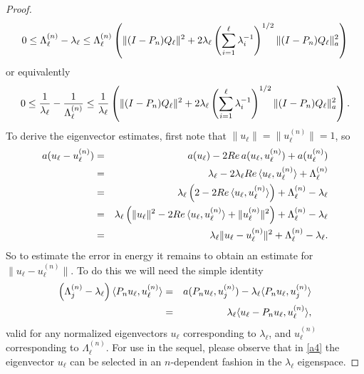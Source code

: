 \documentclass[final]{siamltex}
\numberwithin{equation}{section}
\begin{document}
\begin{proof}
\begin{equation} \notag
0 \le \Lambda_{\ell}^{(n)} -\lambda_{\ell} \le \Lambda_{\ell}^{(n)} \left(\|(I-P_n) Q_{\ell}\|^2 + 2 \lambda_{\ell} \left(\sum_{i=1}^{\ell} \lambda_i^{-1}\right)^{1/2} \|(I-P_n) Q_{\ell}\|_{a}^2
\right)
\end{equation}
or equivalently
\begin{equation} \notag
0 \le \frac{1}{\lambda_{\ell}}- \frac{1}{\Lambda_{\ell}^{(n)}} \le \frac{1}{\lambda_{\ell}} \left(\|(I-P_n) Q_{\ell}\|^2 + 2 \lambda_{\ell} \left(\sum_{i=1}^{\ell} \lambda_i^{-1}\right)^{1/2} \|(I-P_n) Q_{\ell}\|_{a}^2
\right).
\end{equation}
To derive the eigenvector estimates, first note that $\|u_{\ell}\|=\|u_{\ell}^{(n)}\|=1$, so
\begin{eqnarray}
a(u_{\ell}-u_{\ell}^{(n)})&=& a(u_{\ell}) -2 Re \, a(u_{\ell},u_{\ell}^{(n)}) + a (u_{\ell}^{(n)}) \notag \\
&=&  \lambda_{\ell} - 2 \lambda_{\ell} Re \, \langle u_{\ell}, u_{\ell}^{(n)} \rangle +\Lambda_{\ell}^{(n)}\notag \\
&=& \lambda_{\ell} \left(2 -2 Re \, \langle u_{\ell}, u_{\ell}^{(n)} \rangle \right) + \Lambda_{\ell}^{(n)}- \lambda_{\ell}\notag \\
&=&   \lambda_{\ell} \left(\|u_{\ell}\|^2-2 Re \, \langle u_{\ell}, u_{\ell}^{(n)} \rangle + \|u_{\ell}^{(n)}\|^2
\right) + \Lambda_{\ell}^{(n)}- \lambda_{\ell} \notag \\
&=&  \lambda_{\ell} \|u_{\ell}- u_{\ell}^{(n)}\|^2+ \Lambda_{\ell}^{(n)}- \lambda_{\ell}.\notag
\end{eqnarray}
So to estimate the error in energy it remains to obtain an estimate for \newline $ \|u_{\ell}- u_{\ell}^{(n)}\|$. To do this we will need the simple identity
\begin{eqnarray}
\left(\Lambda_{j}^{(n)}- \lambda_{\ell}\right) \langle P_n u_{\ell}, u_{\ell}^{(n)}\rangle
&=& a(P_n u_{\ell},u_{j}^{(n)})- \lambda_{\ell} \langle P_n u_{\ell}, u_{j}^{(n)}\rangle \notag \\
&=& \lambda_{\ell} \langle  u_{\ell}- P_n u_{\ell}, u_{\ell}^{(n)}\rangle,
\label{a4}
\end{eqnarray}
valid for any normalized eigenvectors $u_{\ell}$ corresponding to $\lambda_{\ell}$, and $u_{\ell}^{(n)}$ corresponding to
$\Lambda_{\ell}^{(n)}$. For use in the sequel, please observe that in \eqref{a4} the eigenvector $u_{\ell}$ can be selected in an $n$-dependent fashion in the $\lambda_{\ell}$ eigenspace.


\end{proof}
\end{document}
